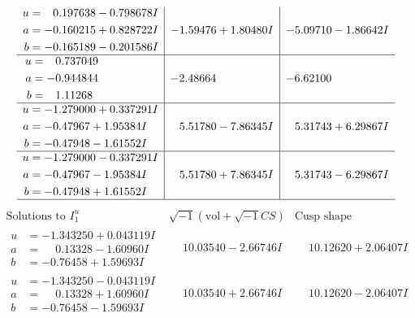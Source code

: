 \documentclass[1p]{elsarticle_modified}
\theoremstyle{definition}
\newcommand{\I}{\sqrt{-1}}
\begin{document}
$$\begin{array}{c|c|c}
\begin{aligned}
u &= \phantom{-}0.197638 - 0.798678 I \\
a &= -0.160215 + 0.828722 I \\
b &= -0.165189 - 0.201586 I\end{aligned}
 & -1.59476 + 1.80480 I & -5.09710 - 1.86642 I \\ \hline\begin{aligned}
u &= \phantom{-}0.737049\phantom{ +0.000000I} \\
a &= -0.944844\phantom{ +0.000000I} \\
b &= \phantom{-}1.11268\phantom{ +0.000000I}\end{aligned}
 & -2.48664\phantom{ +0.000000I} & -6.62100\phantom{ +0.000000I} \\ \hline\begin{aligned}
u &= -1.279000 + 0.337291 I \\
a &= -0.47967 + 1.95384 I \\
b &= -0.47948 - 1.61552 I\end{aligned}
 & \phantom{-}5.51780 - 7.86345 I & \phantom{-}5.31743 + 6.29867 I \\ \hline\begin{aligned}
u &= -1.279000 - 0.337291 I \\
a &= -0.47967 - 1.95384 I \\
b &= -0.47948 + 1.61552 I\end{aligned}
 & \phantom{-}5.51780 + 7.86345 I & \phantom{-}5.31743 - 6.29867 I\\
 \hline 
 \end{array}$$\newpage$$\begin{array}{c|c|c}  
\text{Solutions to }I^u_{1}& \I (\text{vol} + \sqrt{-1}CS) & \text{Cusp shape}\\
 \hline 
\begin{aligned}
u &= -1.343250 + 0.043119 I \\
a &= \phantom{-}0.13328 - 1.60960 I \\
b &= -0.76458 + 1.59693 I\end{aligned}
 & \phantom{-}10.03540 - 2.66746 I & \phantom{-}10.12620 + 2.06407 I \\ \hline\begin{aligned}
u &= -1.343250 - 0.043119 I \\
a &= \phantom{-}0.13328 + 1.60960 I \\
b &= -0.76458 - 1.59693 I\end{aligned}
 & \phantom{-}10.03540 + 2.66746 I & \phantom{-}10.12620 - 2.06407 I \\ \hline\begin{aligned}

\end{aligned}
\end{array}$$
\end{document}
